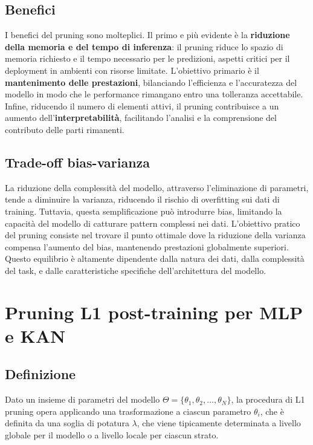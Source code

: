 \documentclass[a4paper,12pt]{report}
\begin{document}
	\subsection{Benefici}
	I benefici del pruning sono molteplici. Il primo e più evidente è la \textbf{riduzione della memoria e del tempo di inferenza}: il pruning riduce lo spazio di memoria richiesto e il tempo necessario per le predizioni, aspetti critici per il deployment in ambienti con risorse limitate. L'obiettivo primario è il \textbf{mantenimento delle prestazioni}, bilanciando l'efficienza e l'accuratezza del modello in modo che le performance rimangano entro una tolleranza accettabile. Infine, riducendo il numero di elementi attivi, il pruning contribuisce a un aumento dell'\textbf{interpretabilità}, facilitando l'analisi e la comprensione del contributo delle parti rimanenti.
	
	\subsection{Trade-off bias-varianza}
	La riduzione della complessità del modello, attraverso l'eliminazione di parametri, tende a diminuire la varianza, riducendo il rischio di overfitting sui dati di training. Tuttavia, questa semplificazione può introdurre bias, limitando la capacità del modello di catturare pattern complessi nei dati. L'obiettivo pratico del pruning consiste nel trovare il punto ottimale dove la riduzione della varianza compensa l'aumento del bias, mantenendo prestazioni globalmente superiori. Questo equilibrio è altamente dipendente dalla natura dei dati, dalla complessità del task, e dalle caratteristiche specifiche dell'architettura del modello.
	
	\section{Pruning L1 post-training per MLP e KAN}
	
	\subsection{Definizione}
	Dato un insieme di parametri del modello $\Theta = \{\theta_1, \theta_2, \dots, \theta_N\}$, la procedura di L1 pruning opera applicando una trasformazione a ciascun parametro $\theta_i$, che è definita da una soglia di potatura $\lambda$, che viene tipicamente determinata a livello globale per il modello o a livello locale per ciascun strato.
	
\end{document}
